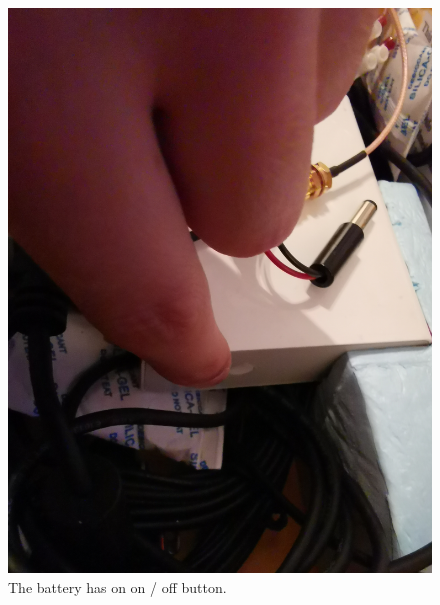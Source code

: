 \documentclass[pdftex,a4paper,12pt,twocolumn,fleqn,captions=tableheading]{scrartcl}
\begin{document}
  \begin{figure}
  \begin{center}
  \includegraphics[width=.8\textwidth]{Figures/battery_on_off}
  \caption{The battery has on on / off button.}
  \end{center}
  \end{figure}
  
\end{document}
